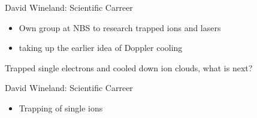 \begin{frame}[t]{David Wineland: Scientific Carreer}
  



  
  
  \begin{minipage}[t][4.5cm][t]{\textwidth-1.5cm}
    \begin{itemize}
      \item<1-> Own group at NBS to research trapped ions and lasers
      \item<2-> taking up the earlier idea of Doppler cooling
    \end{itemize}  
  \end{minipage}
  \begin{minipage}[t][0.2\textheight][t]{\textwidth}
  \end{minipage}
\end{frame}

\begin{frame}[c,plain]
  \begin{center}
      \Large Trapped single electrons and cooled down ion clouds, what is next?  
  \end{center}
\end{frame}

\begin{frame}[t]{David Wineland: Scientific Carreer}
  \begin{minipage}[t][4.5cm][t]{\textwidth-1.5cm}
    \begin{itemize}
      \item Trapping of single ions
    \end{itemize}  
  \end{minipage}
  \begin{minipage}[t][0.2\textheight][t]{\textwidth}
  \end{minipage}
\end{frame}

